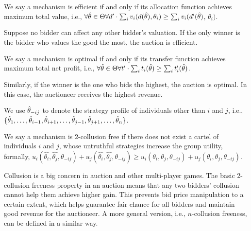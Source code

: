 \begin{definition}[Efficiency]
  We say a mechanism is efficient if and only if its allocation function achieves maximum total
  value, i.e., $\forall \hat{\theta} \in \Theta \forall d' \cdot \sum_{i} v_{i}(d(\hat{\theta}), \theta_{i})
  \geq \sum_{i} v_{i}(d'(\hat{\theta})$, $\theta_{i})$.
\end{definition}

Suppose no bidder can affect any other bidder's valuation.
If the only winner is the bidder who values the good the most, the auction is efficient.

\begin{definition}[Optimality]
  We say a mechanism is optimal if and only if its transfer function achieves maximum total net
  profit, i.e., $\forall \hat{\theta} \in \Theta \forall t' \cdot \sum_i t_i(\hat{\theta}) \geq
  \sum_i t_i'(\hat{\theta})$.
\end{definition}

Similarly, if the winner is the one who bids the highest, the auction is optimal.
In this case, the auctioneer receives the highest revenue.

We use $\hat{\theta}_{-ij}$ to denote the strategy profile of individuals other than $i$ and $j$, i.e.,
$\{\hat{\theta}_1, \allowbreak \ldots, \allowbreak \hat{\theta}_{i-1}, \allowbreak \hat{\theta}_{i+1}, \ldots,
\hat{\theta}_{j-1}, \hat{\theta}_{j+1}, \allowbreak \dots, \hat{\theta}_n\}$.

\begin{definition}
  We say a mechanism is 2-collusion free if there does not exist a cartel of individuals $i$ and
  $j$, whose untruthful strategies increase the group utility, formally,
  $u_i(\hat{\theta_i}, \allowbreak \hat{\theta_j}, \allowbreak \theta_{-ij}) + u_j(\hat{\theta_i},
  \hat{\theta_j},\theta_{-ij}) \geq u_i(\theta_i, \allowbreak \theta_j, \allowbreak \theta_{-ij}) +
  u_j(\theta_i, \theta_j, \theta_{-ij})$.
\end{definition}
Collusion is a big concern in auction and other multi-player games.
The basic 2-collusion freeness property in an auction means that any two bidders' collusion cannot
help them achieve higher gain.
This prevents bid price manipulation to a certain extent, which helps guarantee fair chance for all
bidders and maintain good revenue for the auctioneer.
A more general version, i.e., $n$-collusion freeness, can be defined in a similar way.

